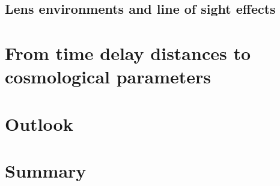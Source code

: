 \subsection{Lens environments and line of sight effects}
\label{ssec:los}




\section{From time delay distances to cosmological parameters}
\label{sec:cosmo}




\section{Outlook}
\label{sec:outlook}




\section{Summary}
\label{sec:summary}





